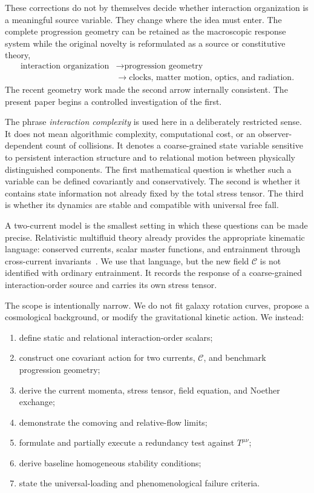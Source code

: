 \documentclass[11pt]{article}
\begin{document}
These corrections do not by themselves decide whether interaction organization is a meaningful source variable.  They change where the idea must enter.  The complete progression geometry can be retained as the macroscopic response system while the original novelty is reformulated as a source or constitutive theory,
\begin{equation}
\begin{aligned}
\text{interaction organization}
&\longrightarrow \text{progression geometry}\\
&\longrightarrow \text{clocks, matter motion, optics, and radiation}.
\end{aligned}
\label{eq:hierarchy}
\end{equation}
The recent geometry work made the second arrow internally consistent.  The present paper begins a controlled investigation of the first.

The phrase \emph{interaction complexity} is used here in a deliberately restricted sense.  It does not mean algorithmic complexity, computational cost, or an observer-dependent count of collisions.  It denotes a coarse-grained state variable sensitive to persistent interaction structure and to relational motion between physically distinguished components.  The first mathematical question is whether such a variable can be defined covariantly and conservatively.  The second is whether it contains state information not already fixed by the total stress tensor.  The third is whether its dynamics are stable and compatible with universal free fall.

A two-current model is the smallest setting in which these questions can be made precise.  Relativistic multifluid theory already provides the appropriate kinematic language: conserved currents, scalar master functions, and entrainment through cross-current invariants~\cite{Brown1993,AnderssonComer2021,Gavassino2019,Ballesteros2014}.  We use that language, but the new field $\mathcal C$ is not identified with ordinary entrainment.  It records the response of a coarse-grained interaction-order source and carries its own stress tensor.

The scope is intentionally narrow.  We do not fit galaxy rotation curves, propose a cosmological background, or modify the gravitational kinetic action.  We instead:
\begin{enumerate}[label=(\roman*)]
\item define static and relational interaction-order scalars;
\item construct one covariant action for two currents, $\mathcal C$, and benchmark progression geometry;
\item derive the current momenta, stress tensor, field equation, and Noether exchange;
\item demonstrate the comoving and relative-flow limits;
\item formulate and partially execute a redundancy test against $T^{\mu\nu}$;
\item derive baseline homogeneous stability conditions;
\item state the universal-loading and phenomenological failure criteria.
\end{enumerate}
\end{document}
